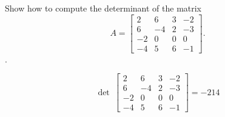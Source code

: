 
\begin{exerciseStatement}


Show how to compute the determinant of the matrix \[A= \left[\begin{array}{cccc}
2 & 6 & 3 & -2 \\
6 & -4 & 2 & -3 \\
-2 & 0 & 0 & 0 \\
-4 & 5 & 6 & -1
\end{array}\right] .\].


\end{exerciseStatement}
    
\begin{exerciseAnswer} 
\[\operatorname{det}\  \left[\begin{array}{cccc}
2 & 6 & 3 & -2 \\
6 & -4 & 2 & -3 \\
-2 & 0 & 0 & 0 \\
-4 & 5 & 6 & -1
\end{array}\right] = -214 \]
\end{exerciseAnswer}
    
